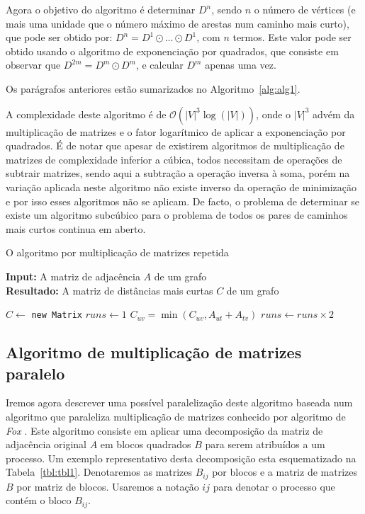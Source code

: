 \documentclass[10pt,a4paper,oneside]{article}
\newcommand{\BigO}[1]{\mathcal{O}(#1)}
\begin{document}
Agora o objetivo do algoritmo é determinar $D^n$, sendo $n$ o número
de vértices (e mais uma unidade que o número máximo de arestas num
caminho mais curto), que pode ser obtido por: $D^n = D^1 \odot \ldots
\odot D^1$, com $n$ termos. Este valor pode ser obtido usando o
algoritmo de exponenciação por quadrados, que consiste em observar que
$D^{2m} = D^m \odot D^m$, e calcular $D^m$ apenas uma vez.

Os parágrafos anteriores estão sumarizados no Algoritmo~\ref{alg:alg1}.

A complexidade deste algoritmo é de $\BigO{|V|^3\log{(|V|)}}$, onde o
$|V|^3$ advém da multiplicação de matrizes e o fator logarítmico de
aplicar a exponenciação por quadrados. É de notar que apesar de
existirem algoritmos de multiplicação de matrizes de complexidade
inferior a cúbica, todos necessitam de operações de subtrair matrizes,
sendo aqui a subtração a operação inversa à soma, porém na variação
aplicada neste algoritmo não existe inverso da operação de minimização
e por isso esses algoritmos não se aplicam. De facto, o problema de
determinar se existe um algoritmo subcúbico para o problema de todos
os pares de caminhos mais curtos continua em aberto.

\begin{algorithm}[t]
\small
\caption{O algoritmo por multiplicação de matrizes repetida}
\renewcommand{\arraystretch}{0.85}
\textbf{Input:} A matriz de adjacência $A$ de um grafo\\
\textbf{Resultado:} A matriz de distâncias mais curtas $C$ de um grafo\\
\renewcommand{\arraystretch}{1.0}
\label{alg:alg1}
\begin{algorithmic}[1]
\State $C \leftarrow $ {\tt new Matrix} 
\State $runs \leftarrow 1$
        \State $C_{uv} = \min{(C_{uv}, A_{ut} + A_{tv})}$
      \EndFor
    \EndFor
  \EndFor
  \State $runs \leftarrow runs \times 2$
\EndWhile
\end{algorithmic}
\end{algorithm}

\subsection{Algoritmo de multiplicação de matrizes paralelo}
Iremos agora descrever uma possível paralelização deste algoritmo
baseada num algoritmo que paraleliza multiplicação de matrizes
conhecido por algoritmo de \textit{Fox} \cite{fox1987matrix}. Este
algoritmo consiste em aplicar uma decomposição da matriz de adjacência
original $A$ em blocos quadrados $B$ para serem atribuídos a um
processo. Um exemplo representativo desta decomposição esta
esquematizado na Tabela~\ref{tbl:tbl1}. Denotaremos as matrizes
$B_{ij}$ por blocos e a matriz de matrizes $B$ por matriz de
blocos. Usaremos a notação $ij$ para denotar o processo que contém o
bloco $B_{ij}$.
\end{document}
